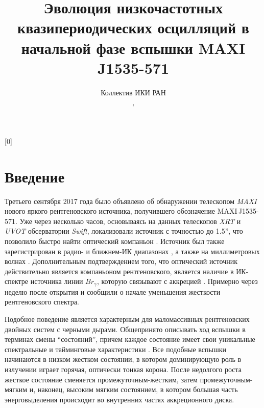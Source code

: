 \documentclass{pazhb}
\def\maxisrc{MAXI\,J1535-571}
\def\maxi{{\em MAXI}}
\begin{document}
[0]

\title{Эволюция низкочастотных квазипериодических осцилляций в начальной фазе вспышки MAXI J1535-571 }

\author{
  Коллектив ИКИ РАН\address{1},
}

\shortauthor{}




\begin{abstract}

  
  \keywords{}

\end{abstract}




\section{Введение}
Третьего сентября 2017 года \cite{negoro17ATel10699} было объявлено об обнаружении телескопом \maxi\, \citep{matsuoka09,negoro16} нового яркого рентгеновского источника, получившего обозначение \maxisrc. Уже через несколько часов, основываясь на данных телескопов {\em XRT} и {\em UVOT} обсерватории {\em Swift}, \cite{kennea17ATel10700} локализовали источник с точностью до 1.5'', что позволило быстро найти оптический компаньон \citep{scaringi17ATel10702}. Источник был также зарегистрирован в радио- \citep{russel17ATel10711} и ближнем-ИК диапазонах \citep{dincer17ATel10716}, а также на миллиметровых волнах \citep{tetarenko17ATel10745}. Дополнительным подтверждением того, что оптический источник действительно является компаньоном рентгеновского, является наличие в ИК-спектре источника линии $Br_{\gamma}$, которую связывают с аккрецией \citep{bandyopadhyay97}. Примерно через неделю после открытия \cite{nakahira17ATel10729} и \cite{kennea17ATel10731} сообщили о начале уменьшения жесткости рентгеновского спектра. 

Подобное поведение является характерным для маломассивных рентгеновских двойных систем с черными дырами. Общепринято описывать ход вспышки в терминах смены ``состояний'', причем каждое состояние имеет свои уникальные спектральные и тайминговые характеристики \citep[подробнее см.][и многие другие]{tanaka96,grebenev97,remillard06,belloni10}. Все подобные вспышки начинаются в низком жестком состоянии, в котором доминирующую роль в излучении играет горячая, оптически тонкая корона. После недолгого роста жесткое состояние сменяется промежуточным-жестким, затем промежуточным-мягким и, наконец, высоким мягким состоянием, в котором большая часть энерговыделения происходит во внутренних частях аккреционного диска. 
\end{document}
